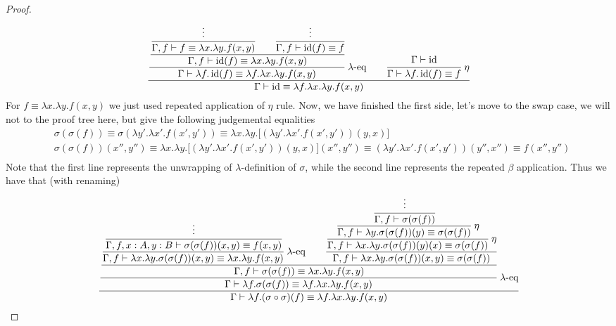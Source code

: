 \begin{proof}
    \begin{equation*}
        \cfrac{\cfrac{\cfrac{\cfrac{\vdots}{\Gamma, f\vdash f\equiv \lambda x.\lambda y.f(x, y)} \qquad \cfrac{\vdots}{\Gamma, f\vdash \operatorname{id}(f)\equiv f}}{\Gamma, f\vdash \operatorname{id}(f)\equiv \lambda x.\lambda y.f(x, y)}}{\Gamma\vdash\lambda f.\operatorname{id}(f)\equiv \lambda f.\lambda x.\lambda y.f(x, y)}\ \lambda\text{-eq}\qquad\cfrac{\Gamma\vdash\operatorname{id}}{\Gamma\vdash\lambda f.\operatorname{id}(f)\equiv f}\ \eta}{\Gamma\vdash\operatorname{id}\equiv \lambda f.\lambda x.\lambda y.f(x, y)}
    \end{equation*}
    For $f\equiv \lambda x.\lambda y.f(x, y)$ we just used repeated application of $\eta$ rule. Now, we have finished the first side, let's move to the swap case, we will not to the proof tree here, but give the following judgemental equalities
    \begin{equation*}
    \begin{aligned}
        &\sigma(\sigma(f))\equiv\sigma(\lambda y'.\lambda x'.f(x', y'))\equiv\lambda x.\lambda y.\big[(\lambda y'.\lambda x'.f(x', y'))(y, x)\big] \\
        &\sigma(\sigma(f))(x'', y'') \equiv \lambda x.\lambda y.\big[(\lambda y'.\lambda x'.f(x', y'))(y, x)\big](x'', y'')\equiv (\lambda y'.\lambda x'.f(x', y'))(y'', x'') \equiv f(x'', y'') \\
    \end{aligned}
    \end{equation*}
    Note that the first line represents the unwrapping of $\lambda$-definition of $\sigma$, while the second line represents the repeated $\beta$ application. Thus we have that (with renaming)
    \begin{equation*}
        \cfrac{\cfrac{\cfrac{\cfrac{\cfrac{\vdots}{\Gamma, f, x:A, y:B \vdash\sigma(\sigma(f))(x, y)\equiv f(x, y)}}{\Gamma, f \vdash \lambda x.\lambda y.\sigma(\sigma(f))(x, y)\equiv \lambda x.\lambda y.f(x, y)}\ \lambda\text{-eq}\qquad \cfrac{\cfrac{\cfrac{\cfrac{\vdots}{\Gamma, f\vdash \sigma(\sigma(f))}}{\Gamma, f\vdash \lambda y.\sigma(\sigma(f))(y)\equiv \sigma(\sigma(f))} \ \eta}{\Gamma, f\vdash \lambda x.\lambda y.\sigma(\sigma(f))(y)(x)\equiv \sigma(\sigma(f))}\ \eta}{\Gamma, f\vdash \lambda x.\lambda y.\sigma(\sigma(f))(x, y)\equiv \sigma(\sigma(f))}}{\Gamma, f\vdash \sigma(\sigma(f))\equiv\lambda x.\lambda y.f(x, y)}}{\Gamma\vdash\lambda f.\sigma(\sigma(f))\equiv\lambda f.\lambda x.\lambda y.f(x, y)}\ \lambda\text{-eq}}{\Gamma\vdash \lambda f.(\sigma\circ\sigma)(f)\equiv\lambda f.\lambda x.\lambda y.f(x, y)}

\end{equation*}
\end{proof}
